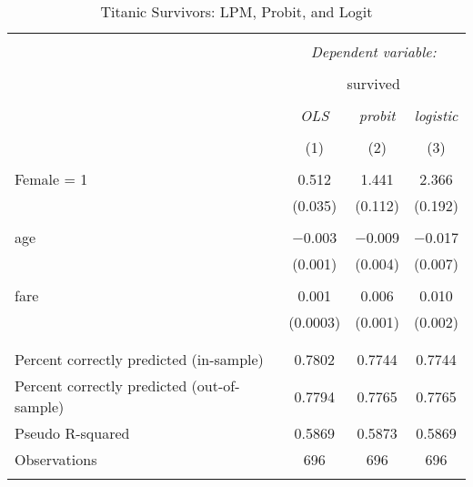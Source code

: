 \documentclass[
  12pt,
]{article}
\begin{document}
\begin{table}[t] \centering 
  \caption{Titanic Survivors: LPM, Probit, and Logit} 
  \label{titanic} 
\begin{tabular}{@{\extracolsep{5pt}}lccc} 
\\[-1.8ex]\hline 
\hline \\[-1.8ex] 
 & \multicolumn{3}{c}{\textit{Dependent variable:}} \\ 
\cline{2-4} 
\\[-1.8ex] & \multicolumn{3}{c}{survived} \\ 
\\[-1.8ex] & \textit{OLS} & \textit{probit} & \textit{logistic} \\ 
\\[-1.8ex] & (1) & (2) & (3)\\ 
\hline \\[-1.8ex] 
 Female = 1 & 0.512 & 1.441 & 2.366 \\ 
  & (0.035) & (0.112) & (0.192) \\ 
  & & & \\ 
 age & $-$0.003 & $-$0.009 & $-$0.017 \\ 
  & (0.001) & (0.004) & (0.007) \\ 
  & & & \\ 
 fare & 0.001 & 0.006 & 0.010 \\ 
  & (0.0003) & (0.001) & (0.002) \\ 
  & & & \\ 
\hline \\[-1.8ex] 
Percent correctly predicted (in-sample) & 0.7802 & 0.7744 & 0.7744 \\ 
Percent correctly predicted (out-of-sample) & 0.7794 & 0.7765 & 0.7765 \\ 
Pseudo R-squared & 0.5869 & 0.5873 & 0.5869 \\ 
Observations & 696 & 696 & 696 \\ 
\hline 
\hline \\[-1.8ex] 
\end{tabular} 
\end{table}
\end{document}
